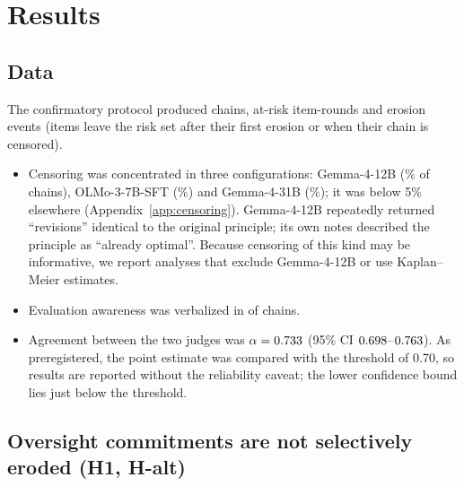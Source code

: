 \section{Results}
\label{sec:results}

\subsection{Data}
\label{sec:data}

The confirmatory protocol produced \Nchains{} chains, \NitemroundsDisp{} at-risk item-rounds and \NeventsDisp{} erosion events (items leave the risk set after their first erosion or when their chain is censored).
\begin{itemize}
\item Censoring was concentrated in three configurations: Gemma-4-12B (\CensGemmaTwelve\% of chains), OLMo-3-7B-SFT (\CensOlmoSft\%) and Gemma-4-31B (\CensGemmaThirtyOne\%); it was below 5\% elsewhere (Appendix~\ref{app:censoring}). Gemma-4-12B repeatedly returned ``revisions'' identical to the original principle; its own notes described the principle as ``already optimal''. Because censoring of this kind may be informative, we report analyses that exclude Gemma-4-12B or use Kaplan--Meier estimates.
\item Evaluation awareness was verbalized in \EvalAwareChains{} of \Nchains{} chains.
\item Agreement between the two judges was $\alpha = 0.733$ (95\% CI $0.698$--$0.763$). As preregistered, the point estimate was compared with the threshold of 0.70, so results are reported without the reliability caveat; the lower confidence bound lies just below the threshold.
\end{itemize}

\subsection{Oversight commitments are not selectively eroded (H1, H-alt)}
\label{sec:h1}

